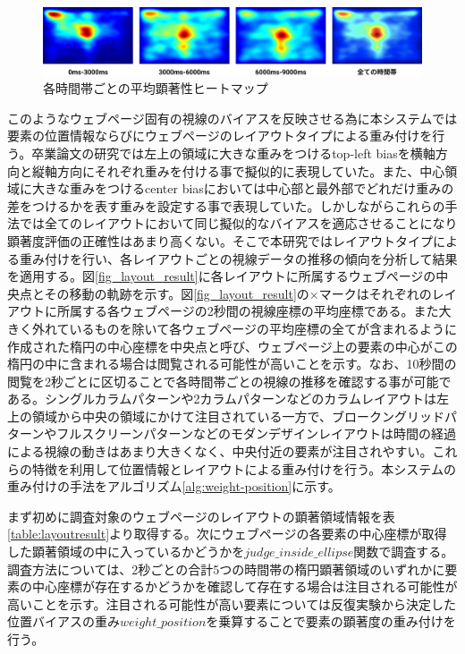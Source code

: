 \begin{figure}[H]
  \centering
  \includegraphics[width=12cm]{figures/06_gazetime.jpg}
  \caption{各時間帯ごとの平均顕著性ヒートマップ}
  \label{fig_gazetime}
\end{figure}

\par このようなウェブページ固有の視線のバイアスを反映させる為に本システムでは要素の位置情報ならびにウェブページのレイアウトタイプによる重み付けを行う。卒業論文の研究では左上の領域に大きな重みをつけるtop-left biasを横軸方向と縦軸方向にそれぞれ重みを付ける事で擬似的に表現していた。また、中心領域に大きな重みをつけるcenter biasにおいては中心部と最外部でどれだけ重みの差をつけるかを表す重みを設定する事で表現していた。しかしながらこれらの手法では全てのレイアウトにおいて同じ擬似的なバイアスを適応させることになり顕著度評価の正確性はあまり高くない。そこで本研究ではレイアウトタイプによる重み付けを行い、各レイアウトごとの視線データの推移の傾向を分析して結果を適用する。図\ref{fig_layout_result}に各レイアウトに所属するウェブページの中央点とその移動の軌跡を示す。図\ref{fig_layout_result}の×マークはそれぞれのレイアウトに所属する各ウェブページの2秒間の視線座標の平均座標である。また大きく外れているものを除いて各ウェブページの平均座標の全てが含まれるように作成された楕円の中心座標を中央点と呼び、ウェブページ上の要素の中心がこの楕円の中に含まれる場合は閲覧される可能性が高いことを示す。なお、10秒間の閲覧を2秒ごとに区切ることで各時間帯ごとの視線の推移を確認する事が可能である。シングルカラムパターンや2カラムパターンなどのカラムレイアウトは左上の領域から中央の領域にかけて注目されている一方で、ブロークングリッドパターンやフルスクリーンパターンなどのモダンデザインレイアウトは時間の経過による視線の動きはあまり大きくなく、中央付近の要素が注目されやすい。これらの特徴を利用して位置情報とレイアウトによる重み付けを行う。本システムの重み付けの手法をアルゴリズム\ref{alg:weight-position}に示す。

\par まず初めに調査対象のウェブページのレイアウトの顕著領域情報を表\ref{table:layoutresult}より取得する。次にウェブページの各要素の中心座標が取得した顕著領域の中に入っているかどうかを$judge\_inside\_ellipse$関数で調査する。調査方法については、2秒ごとの合計5つの時間帯の楕円顕著領域のいずれかに要素の中心座標が存在するかどうかを確認して存在する場合は注目される可能性が高いことを示す。注目される可能性が高い要素については反復実験から決定した位置バイアスの重み$weight\_position$を乗算することで要素の顕著度の重み付けを行う。

